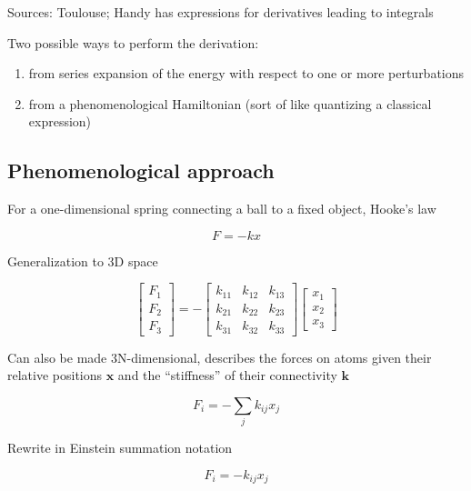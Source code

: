 \documentclass[%
class = book,%
crop = false,%
float = true,%
multi = true,%
preview = false,%
]{standalone}
\begin{document}
Sources: Toulouse; Handy has expressions for derivatives leading to integrals

Two possible ways to perform the derivation:

\begin{enumerate}
\item from series expansion of the energy with respect to one or more perturbations
\item from a phenomenological Hamiltonian (sort of like quantizing a classical expression)
\end{enumerate}

\subsection{Phenomenological approach}

For a one-dimensional spring connecting a ball to a fixed object, Hooke's law

\begin{equation}
  F = -k x
  \label{eq:hooke_1d}
\end{equation}

Generalization to 3D space

\begin{equation}
  \begin{bmatrix}
    F_{1} \\ F_{2} \\ F_{3}
  \end{bmatrix}
  = -
  \begin{bmatrix}
    k_{11} & k_{12} & k_{13} \\
    k_{21} & k_{22} & k_{23} \\
    k_{31} & k_{32} & k_{33}
  \end{bmatrix}
  \begin{bmatrix}
    x_{1} \\ x_{2} \\ x_{3}
  \end{bmatrix}
\end{equation}

Can also be made 3N-dimensional, describes the forces on atoms given their relative positions \(\mathbf{x}\) and the ``stiffness'' of their connectivity \(\mathbf{k}\)

\begin{equation}
  F_{i} = - \sum_{j} k_{ij} x_{j}
\end{equation}

Rewrite in Einstein summation notation

\begin{equation}
  F_{i} = -k_{ij} x_{j}
  \label{eq:force_hooke_einstein}
\end{equation}
\end{document}
